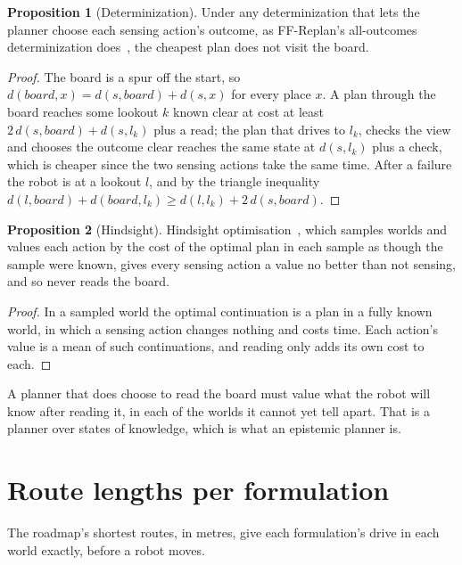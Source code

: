 \documentclass[11pt,a4paper]{article}
\theoremstyle{definition}
\newtheorem{proposition}{Proposition}
\begin{document}
\begin{proposition}[Determinization]
Under any determinization that lets the planner choose each sensing action's
outcome, as FF-Replan's all-outcomes determinization does~\cite{yfg2007}, the
cheapest plan does not visit the board.
\end{proposition}

\begin{proof}
The board is a spur off the start, so $d(\mathit{board}, x) = d(s, \mathit{board})
+ d(s, x)$ for every place $x$. A plan through the board reaches some lookout
$k$ known clear at cost at least $2\,d(s,\mathit{board}) + d(s, l_k)$ plus a read;
the plan that drives to $l_k$, checks the view and chooses the outcome clear
reaches the same state at $d(s, l_k)$ plus a check, which is cheaper since the
two sensing actions take the same time. After a failure the robot is at a
lookout $l$, and by the triangle inequality $d(l, \mathit{board}) +
d(\mathit{board}, l_k) \geq d(l, l_k) + 2\,d(s, \mathit{board})$.
\end{proof}

\begin{proposition}[Hindsight]
Hindsight optimisation~\cite{yfgk2008}, which samples worlds and values each action by the
cost of the optimal plan in each sample as though the sample were known, gives
every sensing action a value no better than not sensing, and so never reads the
board.
\end{proposition}

\begin{proof}
In a sampled world the optimal continuation is a plan in a fully known world,
in which a sensing action changes nothing and costs time. Each action's value
is a mean of such continuations, and reading only adds its own cost to each.
\end{proof}

\noindent
A planner that does choose to read the board must value what the robot will
know after reading it, in each of the worlds it cannot yet tell apart. That is
a planner over states of knowledge, which is what an epistemic planner is.

\section{Route lengths per formulation}
\label{sec:cost}

The roadmap's shortest routes, in metres, give each formulation's drive in
each world exactly, before a robot moves.
\end{document}
